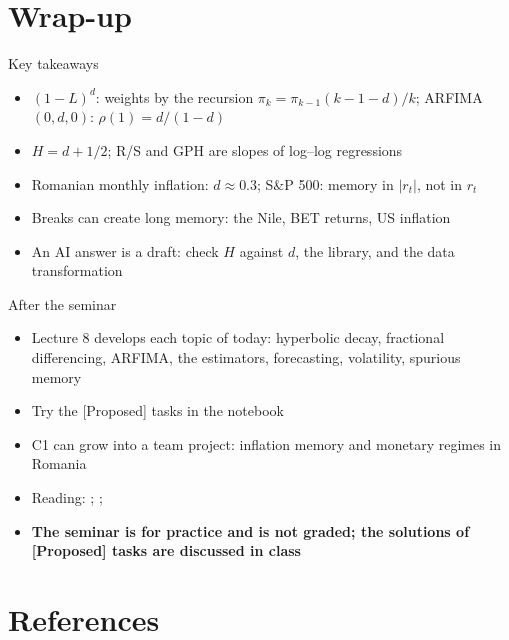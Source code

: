 \section{Wrap-up}

\begin{frame}{Key takeaways}
\itemsize{\small}
\begin{itemize}
    \item $(1-L)^d$: weights by the recursion $\pi_k = \pi_{k-1}(k-1-d)/k$; ARFIMA$(0,d,0)$: $\rho(1) = d/(1-d)$
    \item $H = d + 1/2$; R/S and GPH are slopes of log--log regressions
    \item Romanian monthly inflation: $d \approx 0.3$; S\&P 500: memory in $|r_t|$, not in $r_t$
    \item Breaks can create long memory: the Nile, BET returns, US inflation
    \item An AI answer is a draft: check $H$ against $d$, the library, and the data transformation
\end{itemize}
\end{frame}

\begin{frame}{After the seminar}
\itemsize{\small}
\begin{itemize}
    \item Lecture 8 develops each topic of today: hyperbolic decay, fractional differencing, ARFIMA, the estimators, forecasting, volatility, spurious memory
    \item Try the [Proposed] tasks in the notebook
    \item C1 can grow into a team project: inflation memory and monetary regimes in Romania
    \item Reading: ; ; 
    \item \textbf{The seminar is for practice and is not graded; the solutions of [Proposed] tasks are discussed in class}
\end{itemize}
\end{frame}


\section{References}

